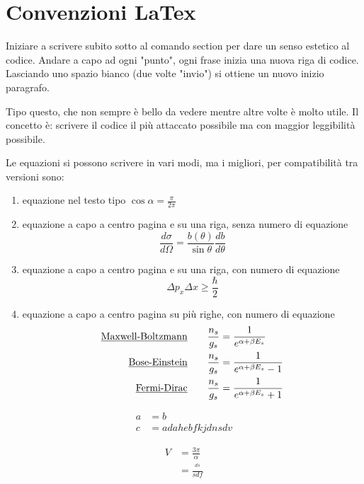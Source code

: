 


\section{Convenzioni LaTex} %
Iniziare a scrivere subito sotto al comando section per dare un senso estetico al codice.
Andare a capo ad ogni "punto", ogni frase inizia una nuova riga di codice.
Lasciando uno spazio bianco (due volte "invio") si ottiene un nuovo inizio paragrafo.

Tipo questo, che non sempre è bello da vedere mentre altre volte è molto utile.
Il concetto è: scrivere il codice il più attaccato possibile ma con maggior leggibilità possibile.

Le equazioni si possono scrivere in vari modi, ma i migliori, per compatibilità tra versioni sono:
\begin{enumerate}
\item equazione nel testo tipo $\cos \alpha = \frac{\pi}{2 \pi}$

\item equazione a capo a centro pagina e su una riga, senza numero di equazione
$$ \frac{d\sigma}{d\Omega}=\frac{b(\theta)}{\sin\theta}\frac{db}{d\theta} $$

\item equazione a capo a centro pagina e su una riga, con numero di equazione 
\begin{equation}
\Delta p_x \Delta x \ge \frac{\hbar}{2}
\end{equation}

\item equazione a capo a centro pagina su più righe, con numero di equazione
\begin{equation}
\begin{split}
\mbox{\underline{Maxwell-Boltzmann}}  \quad\quad  \frac{n_s}{g_s} & = \frac{1}{e^{\alpha + \beta E_s}} \\
\mbox{\underline{Bose-Einstein}}  \quad\quad  \frac{n_s}{g_s} & = \frac{1}{e^{\alpha + \beta E_s} - 1} \\
\mbox{\underline{Fermi-Dirac}}  \quad\quad  \frac{n_s}{g_s} & = \frac{1}{e^{\alpha + \beta E_s} + 1 } 
\end{split}
\end{equation}

\end{enumerate}



\begin{equation}
\begin{split}
a & = b \\
c & = a dahebfkjdnsdv
\end{split}
\end{equation}



\begin{equation}
\begin{split}
V & = \frac{3\pi}{\alpha} \\
& = \frac{^{ ds }}{sdf}
\end{split}
\end{equation}













